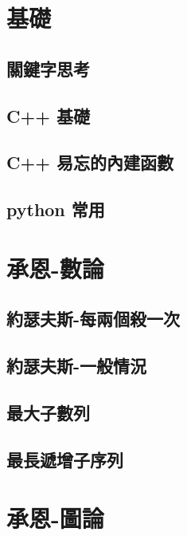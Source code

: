 \section{基礎}
\subsection{關鍵字思考}
\raggedbottom
\hrulefill
\subsection{C++ 基礎}
\raggedbottom
\hrulefill
\subsection{C++ 易忘的內建函數}
\raggedbottom
\hrulefill
\subsection{python 常用}
\raggedbottom
\hrulefill

\section{承恩-數論}
\subsection{約瑟夫斯-每兩個殺一次}
\raggedbottom
\hrulefill
\subsection{約瑟夫斯-一般情況}
\raggedbottom
\hrulefill
\subsection{最大子數列}
\raggedbottom
\hrulefill
\subsection{最長遞增子序列}
\raggedbottom
\hrulefill

\section{承恩-圖論}
